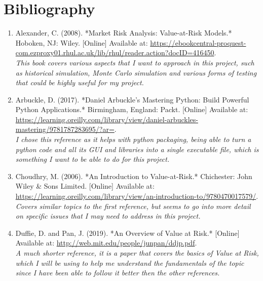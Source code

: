 \documentclass{article}
\begin{document}
\newpage
\section{Bibliography}
\begin{small}
\begin{enumerate}
  \item\label{ref1} Alexander, C. (2008). *Market Risk Analysis: Value-at-Risk Models.* Hoboken, NJ: Wiley. [Online] Available at: \url{https://ebookcentral-proquest-com.ezproxy01.rhul.ac.uk/lib/rhul/reader.action?docID=416450}.
  \\\textit{This book covers various aspects that I want to approach in this project, such as historical simulation, Monte Carlo simulation and various forms of testing that could be highly useful for my project.}
  
  \item\label{ref2} Arbuckle, D. (2017). *Daniel Arbuckle’s Mastering Python: Build Powerful Python Applications.* Birmingham, England: Packt. [Online] Available at: \url{https://learning.oreilly.com/library/view/daniel-arbuckles-mastering/9781787283695/?ar=}.
  \\\textit{I chose this reference as it helps with python packaging, being able to turn a python code and all its GUI and libraries into a single executable file, which is something I want to be able to do for this project.}

  \item\label{ref3} Choudhry, M. (2006). *An Introduction to Value-at-Risk.* Chichester: John Wiley \& Sons Limited. [Online] Available at: \\ \url{https://learning.oreilly.com/library/view/an-introduction-to/9780470017579/}.
  \\\textit{Covers similar topics to the first reference, but seems to go into more detail on specific issues that I may need to address in this project.}
  
  \item\label{ref4} Duffie, D. and Pan, J. (2019). *An Overview of Value at Risk.* [Online] Available at: \url{http://web.mit.edu/people/junpan/ddjp.pdf}.
  \\\textit{A much shorter reference, it is a paper that covers the basics of Value at Risk, which I will be using to help me understand the fundamentals of the topic since I have been able to follow it better then the other references.}
  

\end{enumerate}
\end{small}
\end{document}
